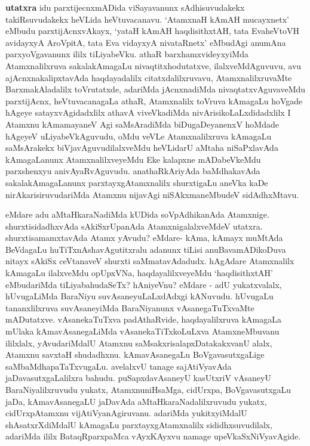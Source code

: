 \begin{artha}
 \textbf{utatxra} idu parxtijecnxmADida viSayavanunx sAdhisuvudakekx takiRsuvudakekx heVLida heVtuvacanavu. `AtamxnaH kAmAH mucayxnetx' eMbudu parxtijAcnxvAkayx, `yataH kAmAH haqdisithxtAH, tata EvaheVtoVH avidayxyA AroVpitA, tata Eva vidayxyA nivataRnetx' eMbudAgi anumAna parxyoVgavanunx ililx tiLiyabeVku. athaR barxhamxvideyxyiMda Atamxnalilxruva sakalakAmagaLu nivaqtitxhodutatxve, ilalxveMdAguvuvu, avu ajAcnxnakalipxtavAda haqdayadalilx citatxdalilxruvavu, AtamxnalilxruvaMte BarxmakAladalilx toVrutatxde, adariMda jAcnxnadiMda nivaqtatxvAguvaveMdu parxtijAcnx, heVtuvacanagaLa athaR, Atamxnalilx toVruva kAmagaLu hoVgade hAgeye satayxvAgidadxlilx athavA viveVkadiMda nivArisikoLaLxdidadxlilx I Atamxnu kAmamayaneV Agi saMsAradiMda biDugaDeyanenxV hoMdade hAgeyeV uLiyabeVkAguvudu, oMdu veVLe Atamxnalilxruva kAmagaLu saMsArakekx biVjavAguvudilalxveMdu heVLidarU aMtaha niSaPxlavAda kAmagaLanunx AtamxnalilxveyeMdu Eke kalapxne mADabeVkeMdu parxshenxyu anivAyaRvAguvudu. anathaRkAriyAda baMdhakavAda sakalakAmagaLanunx parxtayxgAtamxnalilx shurxtigaLu aneVka kaDe nirAkarisiruvudariMda Atamxnu nijavAgi niSAkxmaneMbudeV sidAdhxMtavu.
\end{artha}


\begin{artha}
eMdare adu aMtaHkaraNadiMda kUDida soVpAdhikanAda Atamxnige. shurxtisidadhxvAda sAkiSxrUpanAda AtamxnigalalxveMdeV utatxra. shurxtisamamxtavAda Atamx yAvudu? eMdare- kAma, kAmayx muMtAda BeVdagaLu huTiTxnAshavAgutitxralu adanunx tiLisi anuBavamADikoDuva nitayx sAkiSx ceVtanaveV shurxti saMmatavAdadudx. hAgAdare Atamxnalilx kAmagaLu ilalxveMdu opUpxVNa, haqdayalilxveyeMdu `haqdisithxtAH' eMbudariMda tiLiyabahudaSeTx? hAniyeVnu? eMdare - adU yukatxvalalx, hUvugaLiMda BaraNiyu suvAsaneyuLaLxdAdxgi kANuvudu. hUvugaLu tananxlilxruva suvAsaneyiMda BaraNiyanunx vAsanegaTuTxvaMte mADutatxve. vAsanekaTuTxva padAthaRvide, haqdayalilxruva kAmagaLa mUlaka kAmavAsanegaLiMda vAsanekaTiTxkoLuLxva AtamxneMbuvanu ililxlalx, yAvudariMdalU Atamxnu saMsakxrisalapxDatakakxvanU alalx, Atamxnu savxtaH shudadhxnu. kAmavAsanegaLu BoVgavasutxgaLige saMbaMdhapaTaTxvugaLu. avelalxvU tanage sajAtiVyavAda jaDavasutxgaLalilxra bahudu. puSapxdavAsaneyU kasUtxriV vAsaneyU BaraNiyalilxruvudu yukatx, AtamxnuniHsaMga, cidUrxpa, BoVgavasutxgaLu jaDa, kAmavAsanegaLU jaDavAda aMtaHkaraNadalilxruvudu yukatx, cidUrxpAtamxnu vijAtiVyanAgiruvanu. adariMda yukitxyiMdalU shAsatxrXdiMdalU kAmagaLu parxtayxgAtamxnalilx sididhxsuvudilalx, adariMda ililx BataqRparxpaMca vAyxKAyxvu namage upeVkaSxNiVyavAgide.
\end{artha}

